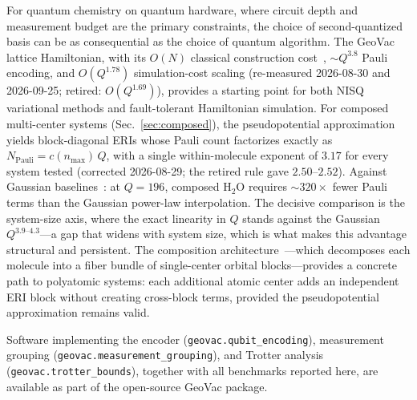 \documentclass[aps,pra,twocolumn,superscriptaddress,longbibliography]{revtex4-2}
\begin{document}
For quantum chemistry on quantum hardware, where circuit depth and
measurement budget are the primary constraints, the choice of
second-quantized basis can be as consequential as the choice of quantum
algorithm.  The GeoVac lattice Hamiltonian, with its $O(N)$ classical
construction cost~\cite{loutey_paper7}, $\sim Q^{3.8}$ Pauli encoding,
and $O(Q^{1.78})$ simulation-cost scaling (re-measured 2026-08-30 and
2026-09-25; retired: $O(Q^{1.69})$), provides a
starting point for both NISQ variational methods and fault-tolerant
Hamiltonian simulation.  For composed multi-center systems (Sec.~\ref{sec:composed}), the
pseudopotential approximation yields block-diagonal ERIs whose Pauli
count factorizes exactly as $N_{\mathrm{Pauli}} = c(n_{\max})\,Q$, with a
single within-molecule exponent of $3.17$ for every system tested
(corrected 2026-08-29; the retired rule gave $2.50$--$2.52$).
Against Gaussian baselines~\cite{trenev2025}: at $Q = 196$, composed
H$_2$O requires $\sim 320\times$ fewer Pauli terms than the Gaussian
power-law interpolation.  The decisive comparison is the system-size
axis, where the exact linearity in $Q$ stands against the Gaussian
$Q^{3.9\text{--}4.3}$---a gap that widens with system size, which is what
makes this advantage structural and persistent.  The composition
architecture~\cite{loutey_paper17}---which decomposes each molecule
into a fiber bundle of single-center orbital blocks---provides a
concrete path to polyatomic systems: each additional atomic center
adds an independent ERI block without creating cross-block terms,
provided the pseudopotential approximation remains valid.

Software implementing the encoder
(\texttt{geovac.qubit\_encoding}), measurement grouping
(\texttt{geovac.measurement\_grouping}), and Trotter analysis
(\texttt{geovac.trotter\_bounds}), together with all benchmarks
reported here, are available as part of the open-source GeoVac package.
\end{document}
